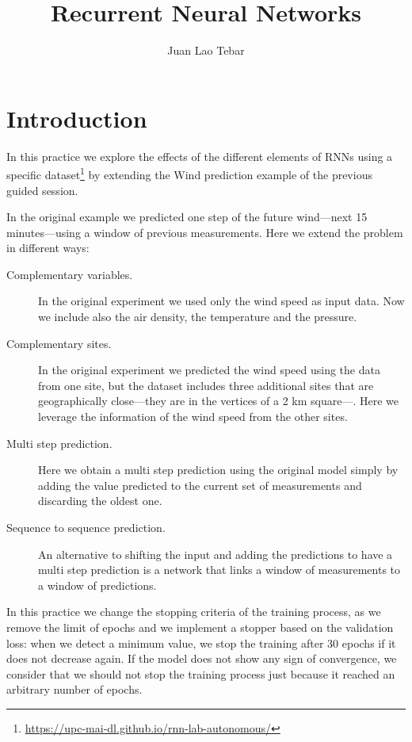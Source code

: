 \documentclass[]{article}
\title{Recurrent Neural Networks}
\author{Juan Lao Tebar}
\begin{document}
	
	\maketitle
	
	\section{Introduction} 

	In this practice we explore the effects of the different elements of RNNs using a specific dataset\footnote{\url{https://upc-mai-dl.github.io/rnn-lab-autonomous/}} by extending the Wind prediction example of the previous guided session.
	
	In the original example we predicted one step of the future wind---next 15 minutes---using a window of previous measurements. Here we extend the problem in different ways:
	
	\begin{description}
		\item [Complementary variables.] In the original experiment we used only the wind speed as input data. Now we include also the air density, the temperature and the pressure.
		
		\item [Complementary sites.] In the original experiment we predicted the wind speed using the data from one site, but the dataset includes three additional sites that are geographically close---they are in the vertices of a 2 km square---. Here we leverage the information of the wind speed from the other sites.
		
		\item [Multi step prediction.] Here we obtain a multi step prediction using the original model simply by adding the value predicted to the current set of measurements and discarding the oldest one.
		
		\item [Sequence to sequence prediction.] An alternative to shifting the input and adding the predictions to have a multi step prediction is a network that links a window of measurements to a window of predictions.
	\end{description}
	
	In this practice we change the stopping criteria of the training process, as we remove the limit of epochs and we implement a stopper based on the validation loss: when we detect a minimum value, we stop the training after 30 epochs if it does not decrease again. If the model does not show any sign of convergence, we consider that we should not stop the training process just because it reached an arbitrary number of epochs.
	
\end{document}
